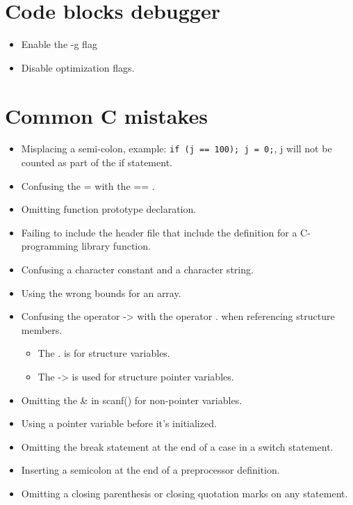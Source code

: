 \section{Code blocks debugger}
\begin{itemize}
    \item Enable the -g flag 
    \item Disable optimization flags.
\end{itemize}


\section{Common C mistakes}
\begin{itemize}
    \item Misplacing a semi-colon, example: \texttt{if (j == 100); j = 0;}, j will not be counted as part of the if statement. 
    \item Confusing the = with the == .
    \item Omitting function prototype declaration.
    \item Failing to include the header file that include the definition for a C-programming library function.
    \item Confusing a character constant and a character string. 
    \item Using the wrong bounds for an array. 
    \item Confusing the operator -> with the operator . when referencing structure members.
        \begin{itemize}
            \item The . is for structure variables.
            \item The -> is used for structure pointer variables.
        \end{itemize}
    \item Omitting the \& in scanf() for non-pointer variables.
    \item Using a pointer variable before it's initialized. 
    \item Omitting the break statement at the end of a case in a switch statement. 
    \item Inserting a semicolon at the end of a preprocessor definition.
    \item Omitting a closing parenthesis or closing quotation marks on any statement.
\end{itemize}


